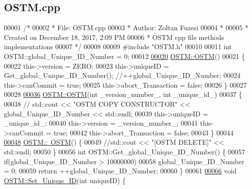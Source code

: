 \hypertarget{_o_s_t_m_8cpp_source}{}\subsection{O\+S\+T\+M.\+cpp}

\begin{DoxyCode}
00001 \textcolor{comment}{/* }
00002 \textcolor{comment}{ * File:   OSTM.cpp}
00003 \textcolor{comment}{ * Author: Zoltan Fuzesi}
00004 \textcolor{comment}{ * }
00005 \textcolor{comment}{ * Created on December 18, 2017, 2:09 PM}
00006 \textcolor{comment}{ * OSTM cpp file methods implementations}
00007 \textcolor{comment}{ */}
00008 
00009 \textcolor{preprocessor}{#include "OSTM.h"}
00010 
00011 \textcolor{keywordtype}{int} OSTM::global\_Unique\_ID\_Number = 0;
00012 
\hypertarget{_o_s_t_m_8cpp_source.tex_l00020}{}\hyperlink{class_o_s_t_m_a968edf778668bd0ec7603f0571619196}{00020} \hyperlink{class_o_s_t_m_a968edf778668bd0ec7603f0571619196}{OSTM::OSTM}()
00021 \{
00022     this->version = ZERO;
00023     this->uniqueID = Get\_global\_Unique\_ID\_Number(); \textcolor{comment}{//++global\_Unique\_ID\_Number;}
00024     this->canCommit = \textcolor{keyword}{true};
00025     this->abort\_Transaction = \textcolor{keyword}{false};
00026 \}
00027 
00028 
\hypertarget{_o_s_t_m_8cpp_source.tex_l00036}{}\hyperlink{class_o_s_t_m_a2314f55a127b94aa8a51d19ba798401e}{00036} \hyperlink{class_o_s_t_m_a968edf778668bd0ec7603f0571619196}{OSTM::OSTM}(\textcolor{keywordtype}{int} \_version\_number\_, \textcolor{keywordtype}{int} \_unique\_id\_)
00037 \{
00038    \textcolor{comment}{// std::cout << "OSTM COPY CONSTRUCTOR" << global\_Unique\_ID\_Number << std::endl;}
00039     this->uniqueID = \_unique\_id\_;
00040     this->version = \_version\_number\_;
00041     this->canCommit = \textcolor{keyword}{true};
00042     this->abort\_Transaction = \textcolor{keyword}{false};
00043 \}
00044 
\hypertarget{_o_s_t_m_8cpp_source.tex_l00048}{}\hyperlink{class_o_s_t_m_a30a17d73d0259c60eeab72d6dfa9ceb1}{00048} \hyperlink{class_o_s_t_m_a30a17d73d0259c60eeab72d6dfa9ceb1}{OSTM::~OSTM}() \{
00049     \textcolor{comment}{//std::cout << "[OSTM DELETE]" << std::endl;}
00050 \}
00056 \textcolor{keywordtype}{int} OSTM::Get\_global\_Unique\_ID\_Number() \{
00057     \textcolor{keywordflow}{if}(global\_Unique\_ID\_Number > 10000000)
00058         global\_Unique\_ID\_Number = 0;
00059     \textcolor{keywordflow}{return} ++global\_Unique\_ID\_Number;
00060 \}
00061 
\hypertarget{_o_s_t_m_8cpp_source.tex_l00066}{}\hyperlink{class_o_s_t_m_ab5019a32185631c08abbf826422f2d93}{00066} \textcolor{keywordtype}{void} \hyperlink{class_o_s_t_m_ab5019a32185631c08abbf826422f2d93}{OSTM::Set\_Unique\_ID}(\textcolor{keywordtype}{int} uniqueID) \{

\end{DoxyCode}
